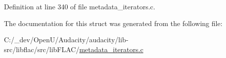 Definition at line 340 of file metadata\+\_\+iterators.\+c.



The documentation for this struct was generated from the following file\+:\begin{DoxyCompactItemize}
\item 
C\+:/\+\_\+dev/\+Open\+U/\+Audacity/audacity/lib-\/src/libflac/src/lib\+F\+L\+A\+C/\hyperlink{metadata__iterators_8c}{metadata\+\_\+iterators.\+c}\end{DoxyCompactItemize}
